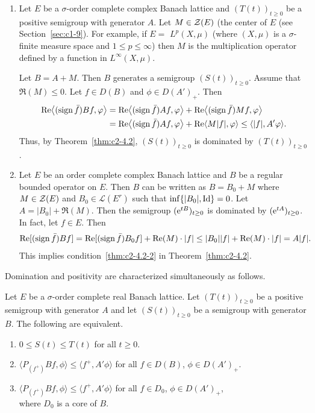 \begin{example}\label{ex:c2-4.4} 
\begin{enumerate}[\upshape (i), wide, labelindent=.25em] %
\item \label{ex:c2-4.4-1}
Let $E$ be a $\sigma$-order complete complex Banach lattice and $(T(t))_{t \geq 0}$ be a positive semigroup with generator $A$. 
Let $M \in \mathcal{Z}(E)$ (the center of\/ $E$ (see Section~\ref{sec:c1-9}). 
For example, if\/ $E =$ $L^{p}(X,\mu)$ (where $(X,\mu)$ is a $\sigma$-finite measure space and $1 \leq p \leq \infty$) then $M$ is the multiplication operator defined by a function in $L^{\infty}(X,\mu)$.

Let $B = A + M$. Then $B$ generates a semigroup $(S(t))_{t \geq 0}$.
Assume that $\Re(M) \leq 0$. Let $f \in D(B)$ and $\phi \in D(A')_{+}$. Then
\begin{align*}
\Re\mleft\langle(\sign  \bar{f})Bf,\phi\mright\rangle &= \Re\mleft\langle(\sign  \bar{f})Af,\phi\mright\rangle + \Re\mleft\langle(\sign  \bar{f})Mf,\phi\mright\rangle\\
&= \Re\mleft\langle(\sign  \bar{f})Af,\phi\mright\rangle + \Re\langle M|f|,\phi\rangle 
\leq \langle|f|,A'\phi\rangle .
\end{align*}
Thus, by Theorem~\ref{thm:c2-4.2}, $(S(t))_{t \geq 0}$ is dominated by $(T(t))_{t \geq 0}$.
\item \label{ex:c2-4.4-2}
Let $E$ be an order complete complex Banach lattice and $B$ be a regular bounded operator on $E$. 
Then $B$ can be written as $B = B_{0} + M$ where $M \in \mathcal{Z}(E)$ and $B_{0} \in \mathcal{L}(E^{r})$ 
such that $\inf \{|B_{0}|, \operatorname{Id}\} = 0$.
Let $A = |B_{0}| + \Re(M)$. 
Then the semigroup $(\eu^{tB})_{t \geq 0}$ is dominated by $(\eu^{tA})_{t \geq 0}$. 
In fact, let $f \in E$. 
Then 
%
\[
	\Re[(\sign  \bar{f})Bf] = \Re[(\sign \bar{f})B_{0}f] + \Re(M) \cdot |f| \leq |B_{0}||f| + \Re(M) 
		\cdot |f| = A|f| .
\]
%
This implies condition~\ref{thm:c2-4.2-2} in Theorem~\ref{thm:c2-4.2}.
\end{enumerate}
\end{example}
Domination and positivity are characterized simultaneously as
follows.
\begin{proposition}\label{prop:c2-4.5}
Let $E$ be a $\sigma$-order complete real Banach lattice.
Let $(T(t))_{t \geq 0}$ be a positive semigroup with generator $A$ and let
$(S(t))_{t \geq 0}$ be a semigroup with generator $B$. The following are equivalent.
\begin{enumerate}[\upshape (a)]
\item \label{prop:c2-4.5-1}
$0 \leq S(t) \leq T(t)$ for all $t \geq 0$.
\item \label{prop:c2-4.5-2}
$\langle P_{(f^{+})}Bf,\phi\rangle \leq \langle f^{+},A'\phi\rangle$ for all $f \in D(B)$, $\phi \in D(A')_{+}$.
\item \label{prop:c2-4.5-3}
$\langle P_{(f^{+})}Bf,\phi\rangle \leq \langle f^{+},A'\phi\rangle$ for all $f \in D_{0}$, $\phi \in D(A')_{+}$,\\
where $D_{0}$ is a core of\/ $B$.
\end{enumerate}
\end{proposition}

